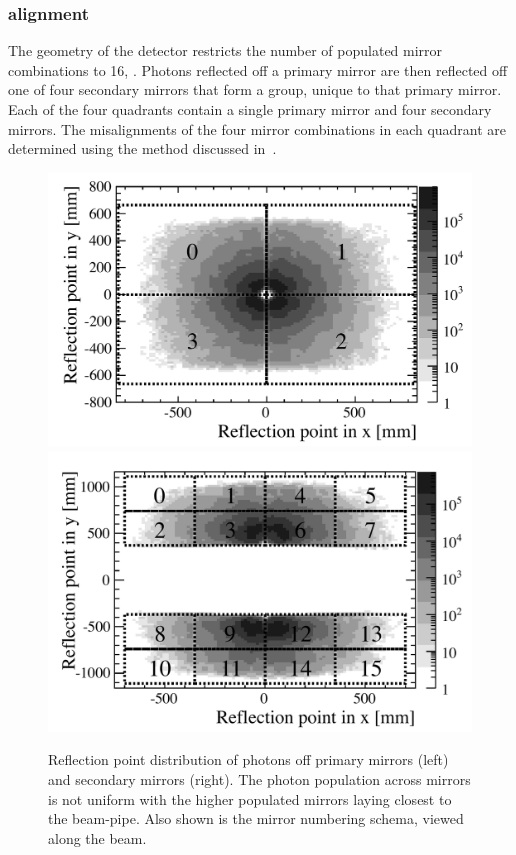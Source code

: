 \subsubsection{\richone alignment}
\label{subsec:Rich1Align}


The geometry of the \lhcb \richone detector restricts the number of populated
mirror combinations to 16, . Photons reflected
off a primary mirror are then reflected off one of four secondary mirrors that
form a group, unique to that primary mirror. Each of the four quadrants contain
a single primary mirror and four secondary mirrors. The misalignments of the
four mirror combinations in each quadrant are determined using the method
discussed in~.
\begin{figure}[htbp]
  \vspace{-0.5\baselineskip}
  \centering
  \includegraphics[width=.48\textwidth]{figs/Method/RICH1_PrimaryMirrors.pdf}
  \includegraphics[width=.48\textwidth]{figs/Method/RICH1_SecondaryMirrors.pdf}
  \vspace{-0.5\baselineskip}
  \caption{
    Reflection point distribution of photons off \richone primary mirrors (left)
    and secondary mirrors (right). The photon population across mirrors is not
    uniform with the higher populated mirrors laying closest to the beam-pipe.
    Also shown is the \richone mirror numbering schema, viewed along the beam.}
  \label{fig:RICH1_MirrorNumbering}
  \vspace{-0.5\baselineskip}
\end{figure}

